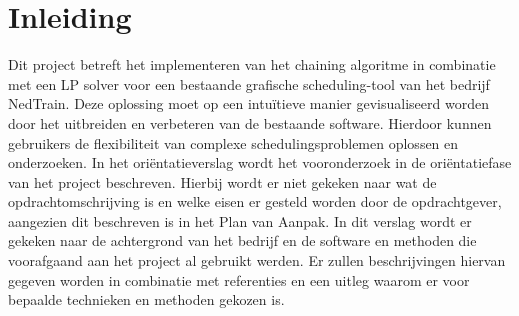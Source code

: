 \section{Inleiding}
Dit project betreft het implementeren van het chaining algoritme in combinatie met een LP solver voor een bestaande grafische scheduling-tool van het bedrijf NedTrain. Deze oplossing moet op een intu\"itieve manier gevisualiseerd worden door het uitbreiden en verbeteren van de bestaande software. Hierdoor kunnen gebruikers de flexibiliteit van complexe schedulingsproblemen oplossen en onderzoeken. In het ori\"entatieverslag wordt het vooronderzoek in de ori\"entatiefase van het project beschreven. Hierbij wordt er niet gekeken naar wat de opdrachtomschrijving is en welke eisen er gesteld worden door de opdrachtgever, aangezien dit beschreven is in het Plan van Aanpak. In dit verslag wordt er gekeken naar de achtergrond van het bedrijf en de software en methoden die voorafgaand aan het project al gebruikt werden. Er zullen beschrijvingen hiervan gegeven worden in combinatie met referenties en een uitleg waarom er voor bepaalde technieken en methoden gekozen is.
